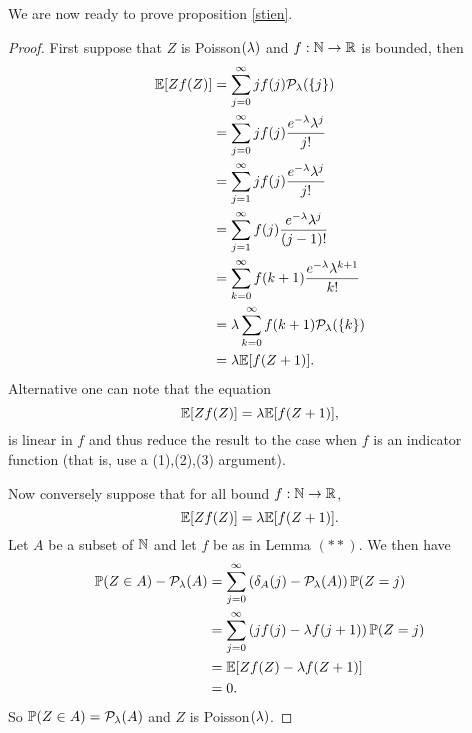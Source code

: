 We are now ready to prove proposition \ref{stien}.
\begin{proof}
    First suppose that $Z$ is Poisson$(\lambda)$ and $f:{{\mathbb N}} \to {\mathbb R}$ is bounded, then 
    \begin{align*}
        {\mathbb{E}}[Zf(Z)]&=\sum_{j=0}^\infty j f(j) {\mathcal{P}}_\lambda(\{j\})\\
        &=\sum_{j=0}^\infty jf(j) \frac{e^{-\lambda}\lambda^j}{j!}\\
        &=\sum_{j=1}^\infty jf(j) \frac{e^{-\lambda}\lambda^j}{j!}\\
        &=\sum_{j=1}^\infty f(j) \frac{e^{-\lambda}\lambda^j}{(j-1)!}\\
        &=\sum_{k=0}^\infty f(k+1) \frac{e^{-\lambda}\lambda^{k+1}}{k!}\\
        &=\lambda \sum_{k=0}^\infty f(k+1){\mathcal{P}}_\lambda(\{k\})\\
        &=\lambda{\mathbb{E}}[f(Z+1)]. 
    \end{align*}
    Alternative one can note that the equation 
    \[{\mathbb{E}}[Zf(Z)] = \lambda {\mathbb{E}}[f(Z+1)],\]
    is linear in $f$ and thus reduce the result to the case when $f$ is an indicator function (that is, use a (1),(2),(3) argument).

    Now conversely suppose that for all bound $f:{{\mathbb N}} \to {\mathbb R}$,
    \[ {\mathbb{E}}[Zf(Z)] = \lambda {\mathbb{E}}[f(Z+1)].\]
    Let $A$ be a subset of ${{\mathbb N}}$ and let $f$ be as in Lemma $(**)$. We then have
    \begin{align*}
        {\mathbb{P}}(Z \in A) - {\mathcal{P}}_\lambda(A) &= \sum_{j=0}^\infty \left(\delta_A(j)-{\mathcal{P}}_\lambda(A)\right){\mathbb{P}}(Z=j)\\
        &=\sum_{j=0}^\infty \left(jf(j)-\lambda f(j+1)\right){\mathbb{P}}(Z=j)\\
        &={\mathbb{E}}[Zf(Z)-\lambda f(Z+1)]\\
        &=0.
    \end{align*}
    So ${\mathbb{P}}(Z \in A) = {\mathcal{P}}_\lambda(A)$ and $Z$ is Poisson$(\lambda)$.
\end{proof}
